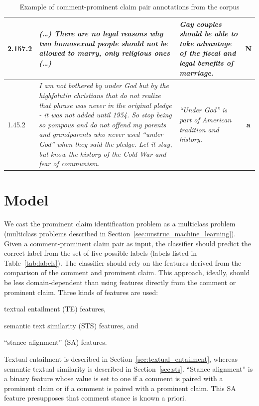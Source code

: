 \begin{table}[t!]
{\begin{tabular}{@{}lp{9.5cm}p{3.5cm}c@{}}
\midrule
2.157.2 & \normalsize{%
\textit{
(\dots) There are no legal reasons why two homosexual people should not be
allowed to marry, only religious ones (\dots)
}
} & \normalsize{%
\textit{
Gay couples should be able to take advantage of the fiscal and legal benefits
of marriage.
}
} & \textbf{N} \\
\midrule
1.45.2 & \normalsize{%
\textit{
 I am not bothered by under God but by the highfalutin christians that do not
 realize that phrase was never in the original pledge - it was not added until
 1954. So stop being so pompous and do not offend my parents and grandparents
 who never used ``under God'' when they said the pledge. Let it stay, but know
 the history of the Cold War and fear of communism.
 }} & 
 \normalsize{
 \textit{
 ``Under God'' is part of American tradition and history.
 }} & \textbf{a}  \\
\bottomrule
\end{tabular}
}
\caption{Example of comment-prominent claim pair annotations from the \ComArg corpus}
\label{tab:comarg}
\end{table}


\section{Model}
\label{sec:argrec_model}

We cast the prominent claim identification problem as a multiclass problem
(multiclass problems described in Section~\ref{sec:unstruc_machine_learning}). 
Given a comment-prominent claim pair as input, the classifier should
predict the correct label from the set of five possible labels (labels
listed in Table~\ref{tab:labels}). 
The classifier should rely on the features derived from the comparison
of the comment and prominent claim. 
This approach, ideally, should be less domain-dependent than using features
directly from the comment or prominent claim. 
Three kinds of features are used: 
\begin{enumerate*}[label=(\arabic*)]
\item textual entailment (TE) features, 
\item semantic text similarity (STS) features, and
\item ``stance alignment'' (SA) features. 
\end{enumerate*}
Textual entailment is described in Section~\ref{sec:textual_entailment}, whereas
semantic textual similarity is described in Section~\ref{sec:sts}. 
``Stance alignment'' is a binary feature whose value is set to one if a
 comment is paired with a  prominent claim or if a
 comment is paired with a  prominent claim. This SA
feature presupposes that comment stance is known a priori.

